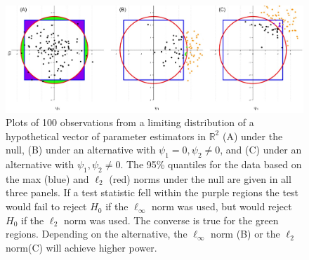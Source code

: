 \documentclass{article}
\begin{document}

\begin{figure}
	\centering
	\includegraphics[width = \linewidth]{figure_code/pwr_cmp.jpeg}
	\caption{Plots of 100 observations from a limiting distribution of a hypothetical vector of parameter estimators in $\mathbb{R}^2$ (A) under the null, (B) under an alternative with $\psi_1 = 0, \psi_2 \neq 0$, and (C) under an alternative with $\psi_1, \psi_2 \neq 0$. The 95\% quantiles for the data based on the max (blue) and $\ell_2$ (red) norms under the null are given in all three panels. If a test statistic fell within the purple regions the test would fail to reject $H_0$ if the $\ell_\infty$ norm was used, but would reject $H_0$ if the $\ell_2$ norm was used.  The converse is true for the green regions.  Depending on the alternative, the $\ell_\infty$ norm (B) or the $\ell_2$ norm(C) will achieve higher power.}
	\label{fig:figure1}
\end{figure}

\end{document}
